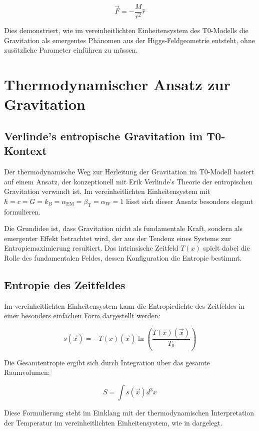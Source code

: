 \documentclass[12pt,a4paper]{article}
\newcommand{\Tfield}{T(x)}
\newcommand{\Tzero}{T_0}
\newcommand{\betaT}{\beta_{\text{T}}}
\newcommand{\alphaEM}{\alpha_{\text{EM}}}
\newcommand{\alphaW}{\alpha_{\text{W}}}
\newcommand{\vecx}{\vec{x}}
\begin{document}
	\begin{equation}
		\vec{F} = -\frac{M}{r^2} \hat{r}
	\end{equation}
	
	Dies demonstriert, wie im vereinheitlichten Einheitensystem des T0-Modells die Gravitation als emergentes Phänomen aus der Higgs-Feldgeometrie entsteht, ohne zusätzliche Parameter einführen zu müssen.
	
	\section{Thermodynamischer Ansatz zur Gravitation}
	
	\subsection{Verlinde's entropische Gravitation im T0-Kontext}
	Der thermodynamische Weg zur Herleitung der Gravitation im T0-Modell basiert auf einem Ansatz, der konzeptionell mit Erik Verlinde's Theorie der entropischen Gravitation verwandt ist. Im vereinheitlichten Einheitensystem mit \(\hbar = c = G = k_B = \alphaEM = \betaT = \alphaW = 1\) lässt sich dieser Ansatz besonders elegant formulieren.
	
	Die Grundidee ist, dass Gravitation nicht als fundamentale Kraft, sondern als emergenter Effekt betrachtet wird, der aus der Tendenz eines Systems zur Entropiemaximierung resultiert. Das intrinsische Zeitfeld \(\Tfield\) spielt dabei die Rolle des fundamentalen Feldes, dessen Konfiguration die Entropie bestimmt.
	
	\subsection{Entropie des Zeitfeldes}
	Im vereinheitlichten Einheitensystem kann die Entropiedichte des Zeitfeldes in einer besonders einfachen Form dargestellt werden:
	
	\begin{equation}
		s(\vecx) = -\Tfield(\vecx) \ln\left(\frac{\Tfield(\vecx)}{\Tzero}\right)
	\end{equation}
	
	Die Gesamtentropie ergibt sich durch Integration über das gesamte Raumvolumen:
	
	\begin{equation}
		S = \int s(\vecx) d^3x
	\end{equation}
	
	Diese Formulierung steht im Einklang mit der thermodynamischen Interpretation der Temperatur im vereinheitlichten Einheitensystem, wie in \cite{pascher_temp_2025} dargelegt.
	
\end{document}
